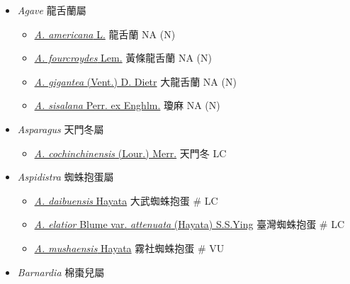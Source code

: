 
  \begin{itemize}
 \item[] \textit{Agave} 龍舌蘭屬
                                
  \begin{itemize}
        \item[] \href{http://www.theplantlist.org/tpl1.1/search?q=Agave+americana}{\textit{A. americana} L.}   龍舌蘭   NA (N)
        \item[] \href{http://www.theplantlist.org/tpl1.1/search?q=Agave+fourcroydes}{\textit{A. fourcroydes} Lem.}   黃條龍舌蘭   NA (N)
        \item[] \href{http://www.theplantlist.org/tpl1.1/search?q=Agave+gigantea}{\textit{A. gigantea} (Vent.) D. Dietr}   大龍舌蘭   NA (N)
        \item[] \href{http://www.theplantlist.org/tpl1.1/search?q=Agave+sisalana}{\textit{A. sisalana} Perr. ex Enghlm.}   瓊麻   NA (N)
  \end{itemize}
 \item[] \textit{Asparagus} 天門冬屬
                                
  \begin{itemize}
        \item[] \href{http://www.theplantlist.org/tpl1.1/search?q=Asparagus+cochinchinensis}{\textit{A. cochinchinensis} (Lour.) Merr.}   天門冬   LC
  \end{itemize}
 \item[] \textit{Aspidistra} 蜘蛛抱蛋屬
                                
  \begin{itemize}
        \item[] \href{http://www.theplantlist.org/tpl1.1/search?q=Aspidistra+daibuensis}{\textit{A. daibuensis} Hayata}   大武蜘蛛抱蛋  \# LC
        \item[] \href{http://www.theplantlist.org/tpl1.1/search?q=Aspidistra+elatior+var.+attenuata}{\textit{A. elatior} Blume var. \textit{attenuata} (Hayata) S.S.Ying}   臺灣蜘蛛抱蛋  \# LC
        \item[] \href{http://www.theplantlist.org/tpl1.1/search?q=Aspidistra+mushaensis}{\textit{A. mushaensis} Hayata}   霧社蜘蛛抱蛋  \# VU
  \end{itemize}
 \item[] \textit{Barnardia} 棉棗兒屬
                                

\end{itemize}
